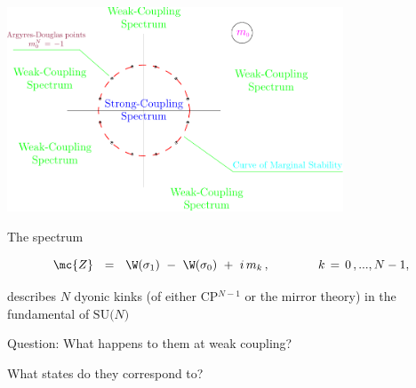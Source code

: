 \documentclass{beamer}
\begin{document}
\begin{frame}{}

\begin{center}
\includegraphics[width=10cm]{mplane.pdf}
\end{center}

\end{frame}


\begin{frame}{}

	The spectrum

\begin{block}{}
\[
	\mc{Z} ~~=~~ \W(\sigma_1) ~-~ \W(\sigma_0) ~+~ i\,m_k\,,
	\qquad\qquad k \,=\, 0\,, ..., N-1,
\]
\end{block}

	describes $ N $ dyonic kinks 
	(of either CP$^{N-1}$ or the mirror theory)
	in the fundamental of $\text{SU($N$)}$

	\pause
\begin{block}{Question:} 
	\qquad\qquad
	What happens to them at weak coupling?
\end{block}

	\pause
\begin{block}{}
	\qquad\qquad
	What states do they correspond to?
\end{block}

\end{frame}
\end{document}
